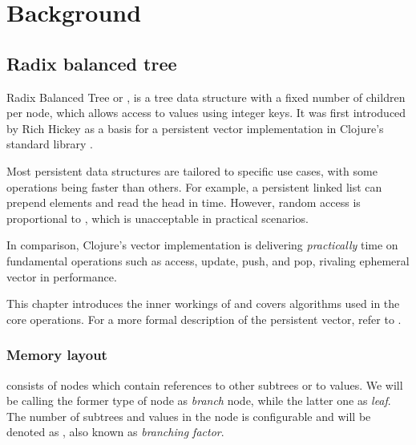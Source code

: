 
\chapter{Background}

\section{Radix balanced tree}
\label{chapter:radix-balanced-tree}

Radix Balanced Tree or \rbtree, is a tree data structure with a fixed number of children per node, which allows access to values using integer keys. It was first introduced by Rich Hickey as a basis for a persistent vector implementation in Clojure's standard library \cite{the-clojure-programming-language}.

Most persistent data structures are tailored to specific use cases, with some operations being faster than others. For example, a persistent linked list can prepend elements and read the head in  time. However, random access is proportional to , which is unacceptable in practical scenarios.

In comparison, Clojure's vector implementation is delivering \emph{practically}  time on fundamental operations such as access, update, push, and pop, rivaling ephemeral vector in performance.

This chapter introduces the inner workings of \rbtree{} and covers algorithms used in the core operations. For a more formal description of the persistent vector, refer to \cite{improving-performance-through-transience}.

\subsection{Memory layout}
\label{sec:rb-tree-memory-layout}

\rbtree{} consists of nodes which contain references to other subtrees or to values. We will be calling the former type of node as \emph{branch} node, while the latter one as \emph{leaf}. The number of subtrees and values in the node is configurable and will be denoted as \m, also known as \emph{branching factor}.


